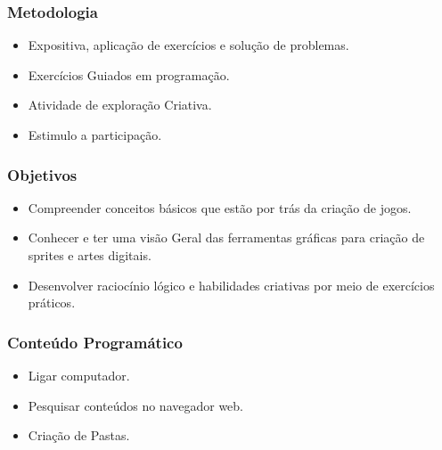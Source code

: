\documentclass[letterpaper,10pt,brazil]{sphinxmanual}
\begin{document}
\subsubsection*{Metodologia}
\begin{itemize}
\item {} 
\sphinxAtStartPar
Expositiva, aplicação de exercícios e solução de problemas.

\item {} 
\sphinxAtStartPar
Exercícios Guiados em programação.

\item {} 
\sphinxAtStartPar
Atividade de exploração Criativa.

\item {} 
\sphinxAtStartPar
Estimulo a participação.

\end{itemize}
\subsubsection*{Objetivos}
\begin{itemize}
\item {} 
\sphinxAtStartPar
Compreender conceitos básicos que estão por trás da criação de jogos.

\item {} 
\sphinxAtStartPar
Conhecer e ter uma visão Geral das ferramentas gráficas para criação de sprites e artes digitais.

\item {} 
\sphinxAtStartPar
Desenvolver raciocínio lógico e habilidades criativas por meio de exercícios práticos.

\end{itemize}
\subsubsection*{Conteúdo Programático}

\sphinxAtStartPar
{}
\begin{itemize}
\item {} 
\sphinxAtStartPar
Ligar computador.

\item {} 
\sphinxAtStartPar
Pesquisar conteúdos no navegador web.

\item {} 
\sphinxAtStartPar
Criação de Pastas.

\end{itemize}
\end{document}
